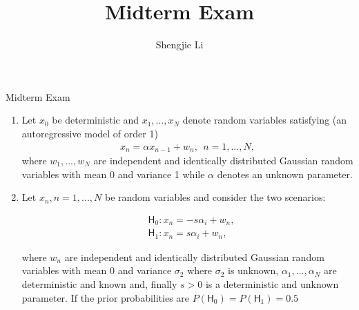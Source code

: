 \documentclass[letter, 12pt]{article}
\author{Shengjie Li}
\title{Midterm Exam}
\begin{document}
	\centerline{Midterm Exam}
	\begin{enumerate}[wide = 0pt, label = \textbf{Problem \arabic*:}]
		\item {Let $ x_0 $ be deterministic and $ x_1 , \dots , x_N $ denote random variables satisfying (an autoregressive model of order 1)
		\begin{align*}
			x_n = \alpha x_{n-1} + w_n , \ \ n = 1, . . . , N, 
		\end{align*}
		where $ w_1 , . . . , w_N $ are independent and identically distributed Gaussian random variables with mean 0 and variance 1 while $ \alpha $ denotes an unknown parameter. }
		\item {Let $ x_n , n = 1, . . . , N $ be random variables and consider the two scenarios:  
			\begin{fleqn}[1cm]
				\begin{align*}
				&\mathsf{H}_0 : x_n = -s\alpha_i + w_n, \\
				&\mathsf{H}_1 : x_n = s\alpha_i + w_n,
				\end{align*}
			\end{fleqn}
			 where $ w_n $ are independent and identically distributed Gaussian random variables with mean 0 and variance $ \sigma_2 $ where $ \sigma_2 $ is unknown, $ \alpha_1 , . . . , \alpha_N $ are deterministic and known and, finally $ s > 0 $ is a deterministic and unknown parameter. If the prior probabilities are $ P(\mathsf{H}_0 ) = P(\mathsf{H}_1 ) = 0.5 $ }
\end{enumerate}
\end{document}
